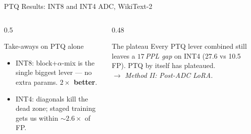 \begin{frame}[shrink=10]{PTQ Results: INT8 and INT4 ADC, WikiText-2}
  \vspace{0.5em}
  \pause
  \begin{columns}[T]
    \begin{column}{0.5\textwidth}
      \begin{alertblock}{\small Take-aways on PTQ alone}
        \scriptsize
        \begin{itemize}
          \item INT8: block+$\alpha$-mix is the single biggest lever — no extra params. \textbf{\color{mygreen!80!black}$2\times$ better}.
          \item INT4: diagonals kill the dead zone; staged training gets us within $\sim 2.6\times$ of FP.
        \end{itemize}
      \end{alertblock}
    \end{column}
    \begin{column}{0.48\textwidth}
      \pause
      \begin{block}{\small The plateau}
        \scriptsize
        Every PTQ lever combined still leaves a \emph{$17\,$PPL gap} on INT4 (27.6 vs 10.5 FP). PTQ by itself has plateaued. \\
        $\to$ \emph{Method II: Post-ADC LoRA.}
      \end{block}
    \end{column}
  \end{columns}
\end{frame}
